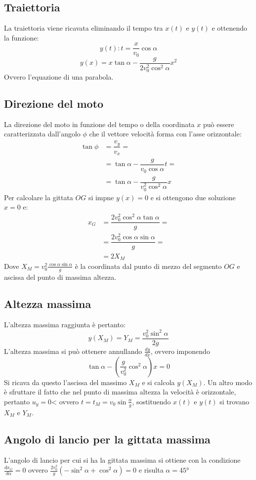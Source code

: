 \documentclass[class=book, crop=false, oneside, 12pt]{standalone}
\begin{document}
	\subsection{Traiettoria}
	La traiettoria viene ricavata eliminando il tempo tra $x(t)$ e $y(t)$ e ottenendo la funzione:
	$$y(t):t=\dfrac{x}{v_0}\cos\alpha$$
	$$y(x)=x\tan\alpha-\dfrac{g}{2v_0^2\cos^2\alpha}x^2$$
	Ovvero l'equazione di una parabola.
	\subsection{Direzione del moto}
	La direzione del moto in funzione del tempo o della coordinata $x$ pu\`o essere caratterizzata dall'angolo $\phi$ che il vettore velocit\`a forma con l'asse orizzontale:
	\begin{align*}
		\tan\phi&=\dfrac{v_y}{v_x}=\\
		        &=\tan\alpha-\dfrac{g}{v_0\cos\alpha}t=\\
				    &=\tan\alpha-\dfrac{g}{v_0^2\cos^2\alpha}x
	\end{align*}
	Per calcolare la gittata $OG$ si impne $y(x)=0$ e si ottengono due soluzione $x=0$ e:
	\begin{align*}
		x_G&=\dfrac{2v_0^2\cos^2\alpha\tan\alpha}{g}=\\
		   &=\dfrac{2v_0^2\cos\alpha\sin\alpha}{g}=\\
			 &=2X_M
	\end{align*}
	Dove $X_M=v_0^2\frac{\cos\alpha\sin\alpha}{g}$ \`e la coordinata dal punto di mezzo del segmento $OG$ e ascissa del punto di massima altezza.
	\subsection{Altezza massima}
	L'altezza massima raggiunta \`e pertanto:
	$$y(X_M)=Y_M=\dfrac{v_0^2\sin^2\alpha}{2g}$$
	L'altezza massima si pu\`o ottenere annullando $\frac{dy}{dx}$, ovvero imponendo
	$$\tan\alpha-(\dfrac{g}{v_0^2}\cos^2\alpha)x=0$$
	Si ricava da questo l'ascissa del massimo $X_M$ e si calcola $y(X_M)$.
	Un altro modo \`e sfruttare il fatto che nel punto di massima altezza la velocit\`a \`e orizzontale, pertanto $u_y=0$< ovvero $t=t_M=v_0\sin\frac{\alpha}{g}$, sostituendo $x(t)$ e $y(t)$ si trovano $X_M$ e $Y_M$.
	\subsection{Angolo di lancio per la gittata massima}
	L'angolo di lancio per cui si ha la gittata massima si ottiene con la condizione $\frac{dx_G}{d\alpha}=0$ ovvero $\frac{2v_0^2}{g}(-\sin^2\alpha+\cos^2\alpha)=0$ e risulta $\alpha=45\si{\degree}$
\end{document}
